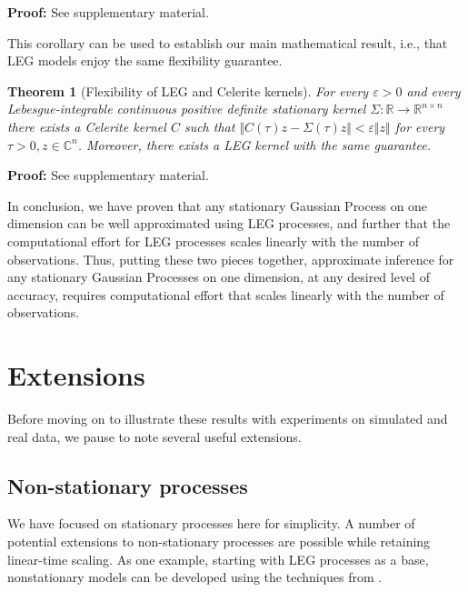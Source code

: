 \documentclass{article}
\newtheorem{theorem}{Theorem}
\theoremstyle{definition}
\begin{document}
{\bf Proof:} See supplementary material.  

This corollary can be used to establish our main mathematical result, i.e., that LEG models enjoy the same flexibility guarantee.  

\begin{theorem}[Flexibility of LEG and Celerite kernels] \label{thm:legflex}
For every $\varepsilon>0$ and every Lebesgue-integrable continuous positive definite stationary kernel $\Sigma: \mathbb{R} \rightarrow \mathbb{R}^{n\times n}$ there exists a Celerite kernel  $C$ such that $\Vert C(\tau)z -\Sigma(\tau)z \Vert < \varepsilon \Vert z \Vert$ for every $\tau>0,z\in\mathbb{C}^n$.   Moreover, there exists a LEG kernel with the same guarantee.
\end{theorem}

{\bf Proof:} See supplementary material.  

In conclusion, we have proven that any stationary Gaussian Process on one dimension can be well approximated using LEG processes, and further that the computational effort for LEG processes scales linearly with the number of observations.  Thus, putting these two pieces together, approximate inference for any stationary Gaussian Processes on one dimension, at any desired level of accuracy, requires computational effort that scales linearly with the number of observations.


                                               

\section{Extensions}

\label{sec:extensions}

Before moving on to illustrate these results with experiments on simulated and real data, we pause to note several useful extensions.

\subsection{Non-stationary processes}  
We have focused on stationary processes here for simplicity.  A number of potential extensions to non-stationary processes are possible while retaining linear-time scaling.  As one example, 
starting with LEG processes as a base, nonstationary models can be developed using the techniques from \cite{benavoli2016state}.  
\end{document}
